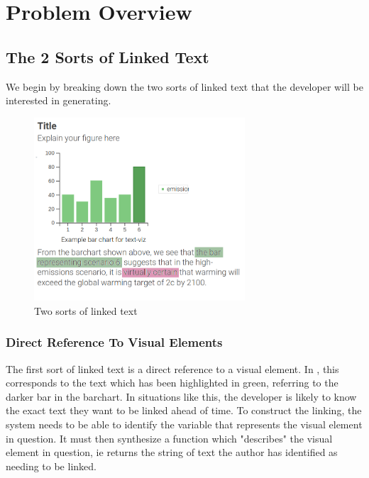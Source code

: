 \section{Problem Overview}
\label{sec:overview}

\subsection{The 2 Sorts of Linked Text}
We begin by breaking down the two sorts of linked text that the developer will
be interested in generating. 

\begin{figure}
   \includegraphics[width=0.7\textwidth]{fig/text-viz-types.png}
   \caption{Two sorts of linked text}
   \label{fig:linked-text-types}
\end{figure}

\subsubsection{Direct Reference To Visual Elements}
The first sort of linked text is a direct reference to a visual element. In 
, this corresponds to the text which has been highlighted
in green, referring to the darker bar in the barchart. In situations like this, the
developer is likely to know the exact text they want to be linked ahead of time.
To construct the linking, the system needs to be able to identify the variable that
represents the visual element in question.  It must then synthesize a function which "describes"
the visual element in question, ie returns the string of text the author has identified as 
needing to be linked.

